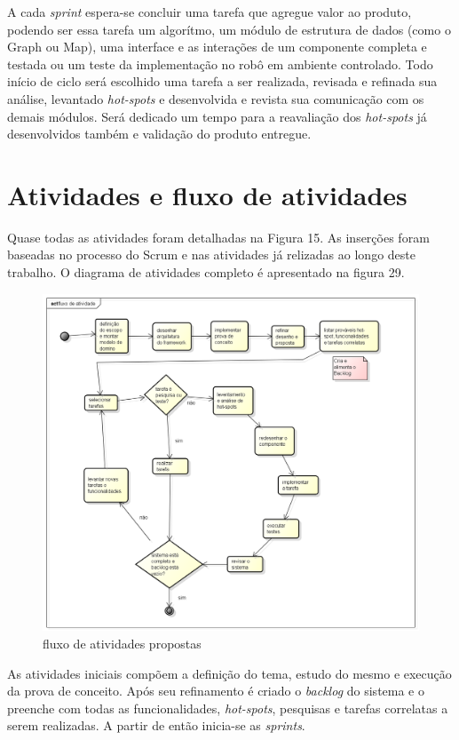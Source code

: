 A cada \textit{sprint} espera-se concluir uma tarefa que agregue valor ao produto, podendo ser essa tarefa um algorítmo, um módulo de estrutura de dados (como o Graph ou Map), uma interface e as interações de um componente completa e testada ou um teste da implementação no robô em ambiente controlado. Todo início de ciclo será escolhido uma tarefa a ser realizada, revisada e refinada sua análise, levantado \textit{hot-spots} e desenvolvida e revista sua comunicação com os demais módulos. Será dedicado um tempo para a reavaliação dos \textit{hot-spots} já desenvolvidos também e validação do produto entregue.

\section{Atividades e fluxo de atividades}

Quase todas as atividades foram detalhadas na Figura 15. As inserções foram baseadas no processo do Scrum e nas atividades já relizadas ao longo deste trabalho. O diagrama de atividades completo é apresentado na figura 29.

\begin{figure}[h]
	\centering
	\label{fig29}
		\includegraphics[keepaspectratio=true,scale=0.4]{figuras/fluxoatvd.png}
	\caption{fluxo de atividades propostas}
\end{figure}

As atividades iniciais compõem a definição do tema, estudo do mesmo e execução da prova de conceito. Após seu refinamento é criado o \textit{backlog} do sistema e o preenche com todas as funcionalidades, \textit{hot-spots}, pesquisas e tarefas correlatas a serem realizadas. A partir de então inicia-se as \textit{sprints}.

